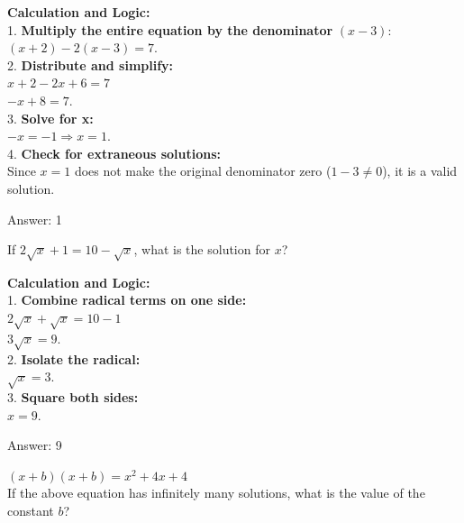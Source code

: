 \documentclass[11pt,paper=a4,answers]{exam}
\begin{document}
\begin{questions}
\begin{solution}
\textbf{Calculation and Logic:} \\
1. \textbf{Multiply the entire equation by the denominator } $(x - 3)$: \\
   $(x + 2) - 2(x - 3) = 7$. \\
2. \textbf{Distribute and simplify:} \\
   $x + 2 - 2x + 6 = 7$ \\
   $-x + 8 = 7$. \\
3. \textbf{Solve for x:} \\
   $-x = -1 \Rightarrow x = 1$. \\
4. \textbf{Check for extraneous solutions:} \\
   Since $x = 1$ does not make the original denominator zero ($1 - 3 \neq 0$), it is a valid solution.

\vspace{30pt}

Answer: \colorbox{yellow!100}{1}
\end{solution}

\vspace{60pt}

\question
If $2\sqrt{x} + 1 = 10 - \sqrt{x}$, what is the solution for $x$?

\begin{solution}
\textbf{Calculation and Logic:} \\
1. \textbf{Combine radical terms on one side:} \\
   $2\sqrt{x} + \sqrt{x} = 10 - 1$ \\
   $3\sqrt{x} = 9$. \\
2. \textbf{Isolate the radical:} \\
   $\sqrt{x} = 3$. \\
3. \textbf{Square both sides:} \\
   $x = 9$.

\vspace{30pt}

Answer: \colorbox{yellow!100}{9}
\end{solution}

\vspace{60pt}

\question
$(x + b)(x + b) = x^2 + 4x + 4$ \\
If the above equation has infinitely many solutions, what is the value of the constant $b$?


\end{questions}
\end{document}
